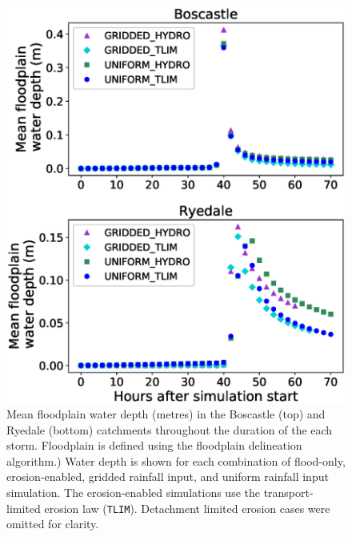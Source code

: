 \begin{figure}[!htbp]
\includegraphics[width=12cm]{chp_flood_figs_scripts/floodplain_mean_depth.eps}
\caption{Mean floodplain water depth (metres) in the Boscastle (top) and Ryedale (bottom) catchments throughout the duration of the each storm. Floodplain is defined using the \citet{clubbinpress} floodplain delineation algorithm.) Water depth is shown for each combination of flood-only, erosion-enabled, gridded rainfall input, and uniform rainfall input simulation. The erosion-enabled simulations use the transport-limited erosion law (\texttt{TLIM}). Detachment limited erosion cases were omitted for clarity.}
\label{fig_floodplain_depth_ensemble}
\end{figure}

